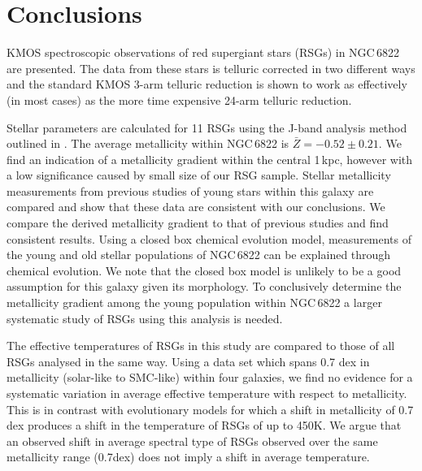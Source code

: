 \documentclass[iop]{emulateapj}
\begin{document}



\section{Conclusions} %
\label{sec:conclusions}

KMOS spectroscopic observations of red supergiant stars (RSGs) in NGC\,6822 are presented.
The data from these stars is telluric corrected in two different ways and the standard KMOS 3-arm telluric reduction is shown to work as effectively (in most cases) as the more time expensive 24-arm telluric reduction.

Stellar parameters are calculated for 11 RSGs using the J-band analysis method outlined in
\cite{Davies10}.
The average metallicity within NGC\,6822 is
$\bar{Z} = -0.52\pm 0.21$.
We find an indication of a metallicity gradient within the central 1\,kpc,
however with a low significance caused by small size of our RSG sample.
Stellar metallicity measurements from previous studies of young stars within this galaxy are compared and show that these data are consistent with our conclusions.
We compare the derived metallicity gradient to that of previous studies and find consistent results.
Using a closed box chemical evolution model,
measurements of the young and old stellar populations of NGC\,6822 can be explained through chemical evolution. 
We note that the closed box model is unlikely to be a good assumption for this galaxy given its morphology.
To conclusively determine the metallicity gradient among the young population within NGC\,6822 a larger systematic study of RSGs using this analysis is needed.

The effective temperatures of RSGs in this study are compared to those of all RSGs analysed in the same way.
Using a data set which spans 0.7 dex in metallicity (solar-like to SMC-like) within four galaxies, we find no evidence for a systematic variation in average effective temperature with respect to metallicity.
This is in contrast with evolutionary models for which a shift in metallicity of 0.7 dex produces a shift in the temperature of RSGs of up to 450K.
We argue that an observed shift in average spectral type of RSGs observed over the same metallicity range (0.7dex) does not imply a shift in average temperature.
\end{document}
